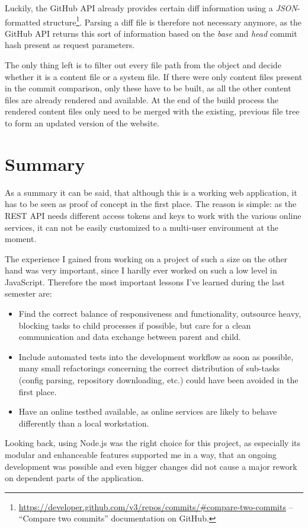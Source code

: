 \documentclass[a4paper,english,11pt]{report}
\begin{document}
Luckily, the GitHub API already provides certain diff information using a \emph{JSON}-formatted structure\footnote{\url{https://developer.github.com/v3/repos/commits/\#compare-two-commits} -- ``Compare two commits'' documentation on GitHub.}.
Parsing a diff file is therefore not necessary anymore, as the GitHub API returns this sort of information based on the \emph{base} and \emph{head} commit hash present as request parameters.

The only thing left is to filter out every file path from the object and decide whether it is a content file or a system file. If there were only content files present in the commit comparison, only these have to be built, as all the other content files are already rendered and available. At the end of the build process the rendered content files only need to be merged with the existing, previous file tree to form an updated version of the website.

\section{Summary}
\label{sec:summary}
As a summary it can be said, that although this is a working web application, it has to be seen as proof of concept in the first place. The reason is simple: as the REST API needs different access tokens and keys to work with the various online services, it can not be easily customized to a multi-user environment at the moment.

The experience I gained from working on a project of such a size on the other hand was very important, since I hardly ever worked on such a low level in JavaScript. Therefore the most important lessons I've learned during the last semester are:

\begin{itemize}
  \item Find the correct balance of responsiveness and functionality, outsource heavy, blocking tasks to child processes if possible, but care for a clean communication and data exchange between parent and child.
  \item Include automated tests into the development workflow as soon as possible, many small refactorings concerning the correct distribution of sub-tasks (config parsing, repository downloading, etc.) could have been avoided in the first place.
  \item Have an online testbed available, as online services are likely to behave differently than a local workstation.
\end{itemize}
Looking back, using Node.js was the right choice for this project, as especially its modular and enhanceable features supported me in a way, that an ongoing development was possible and even bigger changes did not cause a major rework on dependent parts of the application.
\end{document}
